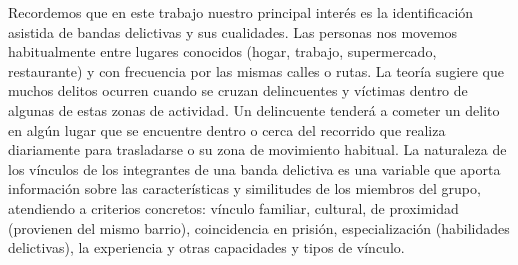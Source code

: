 Recordemos que en este trabajo nuestro principal interés es la identificación asistida de bandas delictivas y sus cualidades. 
Las personas nos movemos habitualmente entre lugares conocidos  (hogar, trabajo, supermercado, restaurante) y con frecuencia por las mismas calles o rutas. La teoría sugiere que muchos delitos ocurren cuando se cruzan delincuentes y víctimas dentro de algunas de estas zonas de actividad.
Un delincuente tenderá a cometer un delito en algún lugar que se encuentre dentro o cerca del recorrido que realiza diariamente para trasladarse o su zona de movimiento habitual.
La naturaleza de los vínculos de los integrantes de una banda delictiva es una variable que aporta información sobre las características y similitudes de los miembros del grupo, atendiendo a criterios concretos: vínculo familiar, cultural, de proximidad (provienen del mismo barrio), coincidencia en prisión, especialización (habilidades delictivas), la experiencia y otras capacidades y   tipos de vínculo.
